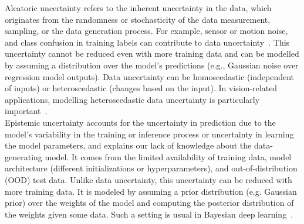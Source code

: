 Aleatoric uncertainty refers to the inherent uncertainty in the data, which originates from the randomness or stochasticity of the data measurement, sampling, or the data generation process. For example, sensor or motion noise, and class confusion in training labels can contribute to data uncertainty~\cite{UncertDeepL}. This uncertainty cannot be reduced even with more training data and can be modelled by assuming a distribution over the model's predictions (e.g., Gaussian noise over regression model outputs). Data uncertainty can be homoscedastic (independent of inputs) or heteroscedastic (changes based on the input). In vision-related applications, modelling heteroscedastic data uncertainty is particularly important~\cite{UncertDeepL}.
\\
Epistemic uncertainty accounts for the uncertainty in prediction due to the model's variability in the training or inference process or uncertainty in learning the model parameters, and explains our lack of knowledge about the data-generating model. It comes from the limited availability of training data, model architecture (different initializations or hyperparameters), and out-of-distribution (OOD) test data. Unlike data uncertainty, this uncertainty can be reduced with more training data. It is modeled by assuming a prior distribution (e.g. Gaussian prior) over the weights of the model and computing the posterior distribution of the weights given some data. Such a setting is usual in Bayesian deep learning~\cite{UncertDeepL2, BayesNN}. 
\newline

